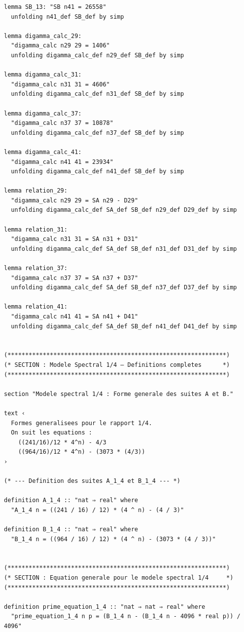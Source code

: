 \documentclass[a4paper,11pt]{article}
\begin{document}
\begin{holcode}[title={\textcolor{white}{File: methode\_spectral.thy -- Part 1/4}}]
\begin{lstlisting}
lemma SB_13: "SB n41 = 26558"
  unfolding n41_def SB_def by simp

lemma digamma_calc_29:
  "digamma_calc n29 29 = 1406"
  unfolding digamma_calc_def n29_def SB_def by simp

lemma digamma_calc_31:
  "digamma_calc n31 31 = 4606"
  unfolding digamma_calc_def n31_def SB_def by simp

lemma digamma_calc_37:
  "digamma_calc n37 37 = 10878"
  unfolding digamma_calc_def n37_def SB_def by simp

lemma digamma_calc_41:
  "digamma_calc n41 41 = 23934"
  unfolding digamma_calc_def n41_def SB_def by simp

lemma relation_29:
  "digamma_calc n29 29 = SA n29 - D29"
  unfolding digamma_calc_def SA_def SB_def n29_def D29_def by simp

lemma relation_31:
  "digamma_calc n31 31 = SA n31 + D31"
  unfolding digamma_calc_def SA_def SB_def n31_def D31_def by simp

lemma relation_37:
  "digamma_calc n37 37 = SA n37 + D37"
  unfolding digamma_calc_def SA_def SB_def n37_def D37_def by simp

lemma relation_41:
  "digamma_calc n41 41 = SA n41 + D41"
  unfolding digamma_calc_def SA_def SB_def n41_def D41_def by simp


(**************************************************************)
(* SECTION : Modele Spectral 1/4 – Definitions completes      *)
(**************************************************************)

section "Modele spectral 1/4 : Forme generale des suites A et B."

text ‹
  Formes generalisees pour le rapport 1/4.
  On suit les equations :
    ((241/16)/12 * 4^n) - 4/3
    ((964/16)/12 * 4^n) - (3073 * (4/3))
›

(* --- Definition des suites A_1_4 et B_1_4 --- *)

definition A_1_4 :: "nat ⇒ real" where
  "A_1_4 n = ((241 / 16) / 12) * (4 ^ n) - (4 / 3)"

definition B_1_4 :: "nat ⇒ real" where
  "B_1_4 n = ((964 / 16) / 12) * (4 ^ n) - (3073 * (4 / 3))"


(**************************************************************)
(* SECTION : Equation generale pour le modele spectral 1/4     *)
(**************************************************************)

definition prime_equation_1_4 :: "nat ⇒ nat ⇒ real" where
  "prime_equation_1_4 n p = (B_1_4 n - (B_1_4 n - 4096 * real p)) / 4096"


\end{lstlisting}
\end{holcode}
\end{document}
